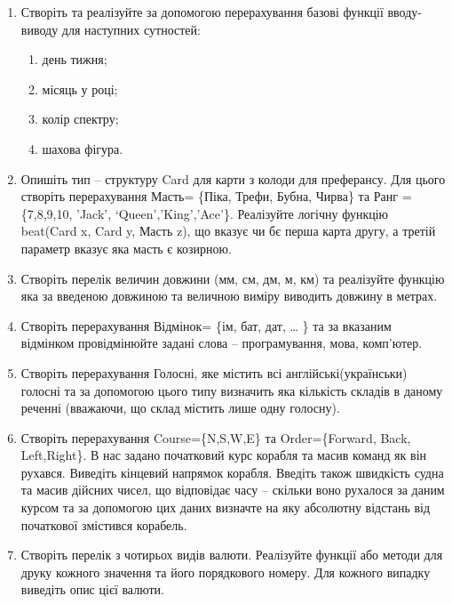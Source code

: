 \documentclass[]{article}
\makeatletter
\newcommand{\xslalph}[1]{\expandafter\@xslalph\csname c@#1\endcsname}
\newcommand{\@xslalph}[1]{%
    \ifcase#1\or а\or б\or в\or г\or д\or e\or є\or ж\or з\or i%
    \or й\or к\or л\or м\or н\or о\or п\or р\or с\or т%
    \or у\or ф\or х\or ц\or ч\or ш\or ю\or я\or аа\or бб\or вв %
    \else\@ctrerr\fi%
}
\makeatother
\begin{document}
\begin{enumerate}
\item
Створіть та реалізуйте за допомогою перерахування базові функції
вводу-виводу для наступних сутностей:
\begin{enumerate}[label=\xslalph*)]
\item
день тижня;
\item
місяць у році;
\item
колір спектру;
\item
шахова фігура.
\end{enumerate}
\item
Опишіть тип -- структуру Card для карти з колоди для преферансу. Для
цього створіть перерахування Масть= \{Піка, Трефи, Бубна, Чирва\} та
Ранг =\{7,8,9,10, 'Jack', `Queen','King','Ace'\}. Реалізуйте логічну
функцію beat(Card x, Card y, Масть z), що вказує чи бє перша карта
другу, а третій параметр вказує яка масть є козирною.
\item
Створіть перелік величин довжини
(мм, см, дм, м, км) та реалізуйте функцію яка за введеною довжиною та
величною виміру виводить довжину в метрах.
\item
Створіть перерахування Відмінок= \{ім, бат, дат, \ldots{} \} та за
вказаним відмінком провідмінюйте задані слова -- програмування, мова,
комп'ютер.
\item
Створіть перерахування Голосні, яке містить всі англійські(українськи)
голосні та за допомогою цього типу визначить яка кількість складів в
даному реченні (вважаючи, що склад містить лише одну голосну).
\item
Створіть перерахування Course=\{N,S,W,E\} та Order=\{Forward, Back,
Left,Right\}. В нас задано початковий курс корабля та масив команд як
він рухався. Виведіть кінцевий напрямок корабля. Введіть також швидкість
судна та масив дійсних чисел, що відповідає часу -- скільки воно
рухалося за даним курсом та за допомогою цих даних визначте на яку
абсолютну відстань від початкової змістився корабель.

\item
 Створіть перелік з чотирьох видів валюти. Реалізуйте функції або методи для друку кожного значення та його порядкового номеру.
Для кожного випадку виведіть опис цієї валюти.

\end{enumerate}
\end{document}
